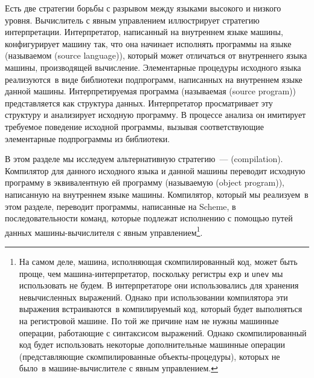 Есть две стратегии борьбы с разрывом между языками высокого
и низкого уровня.  Вычислитель с явным управлением иллюстрирует
стратегию интерпретации.  Интерпретатор, написанный на внутреннем
языке машины, конфигурирует машину так, что она начинает исполнять
программы на языке (называемом  (source language)), который может отличаться от внутреннего языка машины,
производящей вычисление.  Элементарные процедуры исходного языка
реализуются~в виде библиотеки подпрограмм, написанных на внутреннем
языке данной машины.  Интерпретируемая программа (называемая 
 (source program))
представляется как структура данных.  Интерпретатор просматривает эту
структуру и анализирует исходную программу.  В процессе анализа он
имитирует требуемое поведение исходной программы, вызывая
соответствующие элементарные подпрограммы из библиотеки.

В этом разделе мы исследуем альтернативную стратегию~---
 (compilation).  Компилятор для данного
исходного языка и данной машины переводит исходную программу в
эквивалентную ей программу (называемую 
 (object program)), написанную на
внутреннем языке машины.  Компилятор, который мы реализуем~в этом
разделе, переводит программы, написанные на Scheme, в
последовательности команд, которые подлежат исполнению с помощью путей
данных машины-вычислителя с явным управлением\footnote{На самом деле, машина, исполняющая скомпилированный
код, может быть проще, чем машина-интерпретатор, поскольку регистры
{\tt exp} и {\tt unev} мы использовать не будем.  В
интерпретаторе они использовались для хранения невычисленных
выражений.  Однако при использовании компилятора эти выражения
встраиваются~в компилируемый код, который будет выполняться на
регистровой машине.  По той же причине нам не нужны 
машинные операции, 
работающие с синтаксисом выражений.  Однако скомпилированный код будет
использовать некоторые дополнительные машинные операции
(представляющие скомпилированные объекты-процедуры), которых не
было~в машине-вычислителе с явным управлением.
}.

